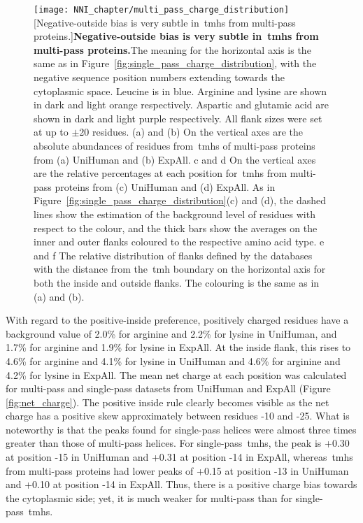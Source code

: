 \begin{figure}[!p]
\centering
\texttt{[image: NNI\_chapter/multi\_pass\_charge\_distribution]}
[Negative-outside bias is very subtle in~\gls{tmh}s from multi-pass proteins.]{\textbf{Negative-outside bias is very subtle in~\gls{tmh}s from multi-pass proteins.}The meaning for the horizontal axis is the same as in Figure~\ref{fig:single_pass_charge_distribution}, with the negative sequence position numbers extending towards the cytoplasmic space.
Leucine is in blue.
Arginine and lysine are shown in dark and light orange respectively.
Aspartic and glutamic acid are shown in dark and light purple respectively.
All flank sizes were set at up to $\pm$20 residues.
(a) and (b) On the vertical axes are the absolute abundances of residues from~\gls{tmh}s of multi-pass proteins from (a) UniHuman and (b) ExpAll.
c and d On the vertical axes are the relative percentages at each position for~\gls{tmh}s from multi-pass proteins from (c) UniHuman and (d) ExpAll.
As in Figure~\ref{fig:single_pass_charge_distribution}(c) and (d), the dashed lines show the estimation of the background level of residues with respect to the colour, and the thick bars show the averages on the inner and outer flanks coloured to the respective amino acid type.
e and f The relative distribution of flanks defined by the databases with the distance from the~\gls{tmh} boundary on the horizontal axis for both the inside and outside flanks.
The colouring is the same as in (a) and (b).}

\label{fig:multi_pass_charge_distribution}
\end{figure}

With regard to the positive-inside preference, positively charged residues have a background value of 2.0\% for arginine and 2.2\% for lysine in UniHuman, and 1.7\% for arginine and 1.9\% for lysine in ExpAll.
At the inside flank, this rises to 4.6\% for arginine and 4.1\% for lysine in UniHuman and 4.6\% for arginine and 4.2\% for lysine in ExpAll.
The mean net charge at each position was calculated for multi-pass and single-pass datasets from UniHuman and ExpAll (Figure \ref{fig:net_charge}).
The positive inside rule clearly becomes visible as the net charge has a positive skew approximately between residues -10 and -25.
What is noteworthy is that the peaks found for single-pass helices were almost three times greater than those of multi-pass helices.
For single-pass~\gls{tmh}s, the peak is +0.30 at position -15 in UniHuman and +0.31 at position -14 in ExpAll, whereas~\gls{tmh}s from multi-pass proteins had lower peaks of +0.15 at position -13 in UniHuman and +0.10 at position -14 in ExpAll.
Thus, there is a positive charge bias towards the cytoplasmic side; yet, it is much weaker for multi-pass than for single-pass~\gls{tmh}s.

